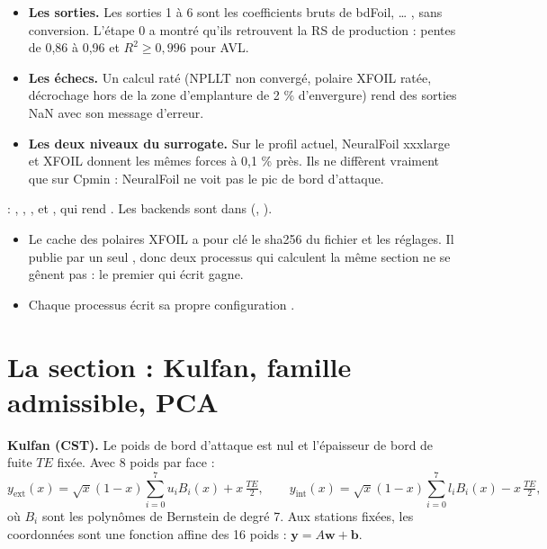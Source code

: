 \documentclass[10pt,a4paper]{article}
\newcommand{\vw}{\bm{w}}
\begin{document}
\begin{itemize}
  \item \textbf{Les sorties.} Les sorties 1 à 6 sont les coefficients bruts de bdFoil,  … ,
        sans conversion. L'étape 0 a montré qu'ils retrouvent la RS de production : pentes de 0,86 à 0,96 et
        $R^2\ge0{,}996$ pour AVL.
  \item \textbf{Les échecs.} Un calcul raté (NPLLT non convergé, polaire XFOIL ratée, décrochage hors de la
        zone d'emplanture de 2 \% d'envergure) rend des sorties NaN avec son message d'erreur.
  \item \textbf{Les deux niveaux du surrogate.} Sur le profil actuel, NeuralFoil xxxlarge et XFOIL donnent les
        mêmes forces à 0,1 \% près. Ils ne diffèrent vraiment que sur Cpmin : NeuralFoil ne voit pas le pic de
        bord d'attaque.
\end{itemize}

\begin{danslecode}
 : , , , et , qui rend . Les backends sont dans 
(, ).
\begin{itemize}
  \item Le cache des polaires XFOIL a pour clé le sha256 du fichier  et les réglages. Il publie par
        un seul , donc deux processus qui calculent la même section ne se gênent pas : le
        premier qui écrit gagne.
  \item Chaque processus écrit sa propre configuration .
\end{itemize}
\end{danslecode}

\section{La section : Kulfan, famille admissible, PCA}
\label{sec:section}
\textbf{Kulfan (CST).} Le poids de bord d'attaque est nul et l'épaisseur de bord de fuite $TE$ fixée. Avec 8
poids par face :
\[
  y_{\text{ext}}(x) = \sqrt{x}(1-x)\sum_{i=0}^{7} u_i B_i(x) + x\,\tfrac{TE}{2},\qquad
  y_{\text{int}}(x) = \sqrt{x}(1-x)\sum_{i=0}^{7} l_i B_i(x) - x\,\tfrac{TE}{2},
\]
où $B_i$ sont les polynômes de Bernstein de degré 7. Aux stations fixées, les coordonnées sont une fonction
affine des 16 poids : $\bm{y}=A\vw+\bm{b}$.
\end{document}
